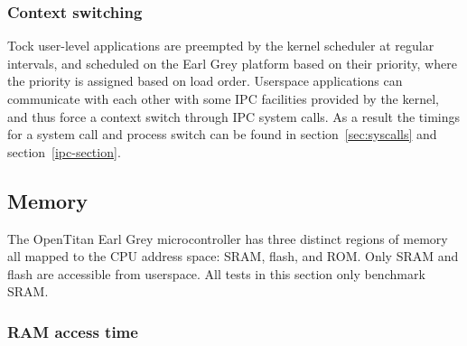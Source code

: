 \documentclass{article}
\begin{document}
\subsubsection{Context switching}

Tock user-level applications are preempted by the kernel scheduler at regular intervals, and scheduled on the Earl Grey platform based on their priority, where the priority is assigned based on load order. Userspace applications can communicate with each other with some IPC facilities provided by the kernel, and thus force a context switch through IPC system calls. As a result the timings for a system call and process switch can be found in section~\ref{sec:syscalls} and section~\ref{ipc-section}.

\subsection{Memory}

The OpenTitan Earl Grey microcontroller has three distinct regions of memory all mapped to the CPU address space: SRAM, flash, and ROM. Only SRAM and flash are accessible from userspace. All tests in this section only benchmark SRAM.

\subsubsection{RAM access time}

\end{document}
